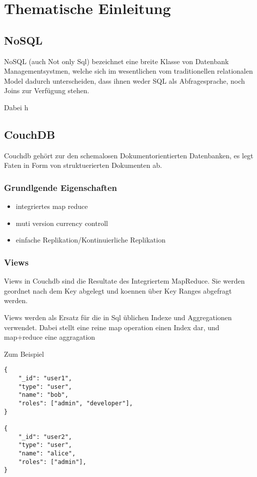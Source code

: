 \chapter{Thematische Einleitung}

\section{NoSQL}

NoSQL (auch Not only Sql) bezeichnet eine breite Klasse
von Datenbank Managementsystmen, welche sich im wesentlichen
vom traditionellen relationalen Model dadurch unterscheiden,
dass ihnen weder SQL als Abfragesprache, noch Joins zur Verfügung stehen.

Dabei h

\section{CouchDB}

Couchdb gehört zur den schemalosen Dokumentorientierten Datenbanken,
es legt Faten in Form von struktuerierten Dokumenten ab.

\subsection{Grundlgende Eigenschaften}

\begin{itemize}
\item integriertes map reduce
\item muti version currency controll
\item einfache Replikation/Kontinuierliche Replikation


\end{itemize}


\subsection{Views}

Views in Couchdb sind die Resultate des Integriertem MapReduce.
Sie werden geordnet nach dem Key abgelegt und koennen über Key Ranges abgefragt werden.


Views werden als Ersatz für die in Sql üblichen Indexe und Aggregationen verwendet.
Dabei stellt eine  reine map operation einen Index dar, und map+reduce eine aggragation

\newpage
Zum Beispiel
\begin{lstlisting}
{
    "_id": "user1",
    "type": "user",
    "name": "bob",
    "roles": ["admin", "developer"],
}

{
    "_id": "user2",
    "type": "user",
    "name": "alice",
    "roles": ["admin"],
}
\end{lstlisting}


